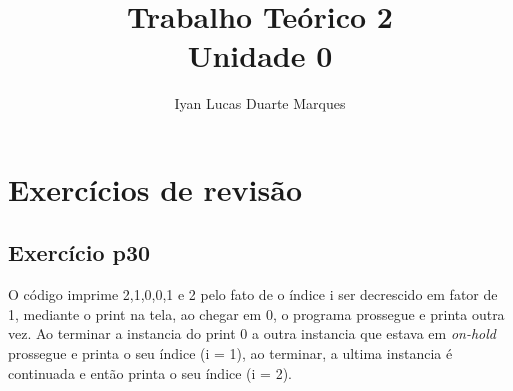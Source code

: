 \documentclass[12pt]{article}
\title{Trabalho Teórico 2\\Unidade 0}
\author{Iyan Lucas Duarte Marques}
\begin{document}
\maketitle

\section{Exercícios de revisão}
\subsection{Exercício p30}
O código imprime 2,1,0,0,1 e 2 pelo fato de o índice i ser decrescido em fator de 1, mediante o print
na tela, ao chegar em 0, o programa prossegue e printa outra vez. Ao terminar a instancia do print 0
a outra instancia que estava em \textit{on-hold} prossegue e printa o seu índice (i = 1), ao terminar,
a ultima instancia é continuada e então printa o seu índice (i = 2).
\end{document}
